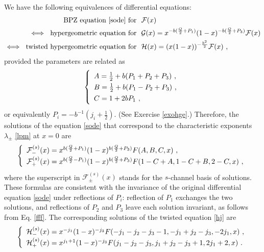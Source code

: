 \documentclass[12pt, a4paper, notitlepage, twoside]{report}
\numberwithin{equation}{section}
\theoremstyle{break}
\begin{document}
We have the following equivalences of differential equations:
\begin{align}
  \text{BPZ equation \eqref{sode} for\ \ } & \mathcal{F}(x)
\\ 
\iff\ \text{hypergeometric equation for\ \ }&  \mathcal{G}(x)= x^{-b(\frac{Q}{2}+P_1)}(1-x)^{-b(\frac{Q}{2}+P_3)}\mathcal{F}(x) 
\label{heg}
\\
\iff\  \text{twisted\ hypergeometric equation for\ \ }& \mathcal{H}(x)=(x(1-x))^{-\frac{b^2}{2}}\mathcal{F}(x) \ ,
\label{fgs}
\end{align}
provided the parameters are related as
\begin{align}
\renewcommand{\arraystretch}{1.3}
\left\{\begin{array}{l}   A = \frac12 + b(P_1+P_2+P_3) \ , \\
      B = \frac12 + b(P_1-P_2+P_3) \ , \\
      C = 1 + 2bP_1 \ ,
\end{array}\right. 
\label{abc}
\end{align}
or equivalently $P_i = -b^{-1}(j_i +\frac12)$.
(See Exercise \ref{exohge}.) 
Therefore, the solutions of the equation \eqref{sode} that correspond to the characteristic exponents $\lambda_\pm$ \eqref{lpm} at $x=0$ are 
\begin{align}
\renewcommand{\arraystretch}{1.3}
\left\{\begin{array}{l}  \mathcal{F}^{(s)}_-(x) = x^{b(\frac{Q}{2}+P_1)} (1-x)^{b(\frac{Q}{2}+P_3)} F(A,B,C,x)\ ,
\\ \mathcal{F}^{(s)}_+(x)   = x^{b(\frac{Q}{2}-P_1)} (1-x)^{b(\frac{Q}{2}+P_3)} F(1-C+A,1-C+B,2-C,x) \ ,
\end{array}\right. 
\label{gpm}
\end{align}
where the superscript in $\mathcal{F}^{(s)}_\pm(x)$ stands for the $s$-channel basis of solutions.
These formulas are consistent with the invariance of the original differential equation \eqref{sode} under reflections of $P_i$: reflection of $P_1$ exchanges the two solutions, and reflections of $P_2$ and $P_3$ leave each solution invariant, as follows from Eq. \eqref{fff}.
The corresponding solutions of the twisted equation \eqref{hj} are 
\begin{align}
\renewcommand{\arraystretch}{1.3}
\left\{\begin{array}{l}  \mathcal{H}^{(s)}_-(x)  = x^{-j_1}(1-x)^{-j_3} F(-j_1-j_2-j_3-1,-j_1+j_2-j_3,-2j_1,x)\ ,
\\
 \mathcal{H}^{(s)}_+(x)  = x^{j_1+1}(1-x)^{-j_3} F(j_1-j_2-j_3,j_1+j_2-j_3+1,2j_1+2,x)\ .
\end{array}\right. 
\label{fpm}
\end{align}
\end{document}
